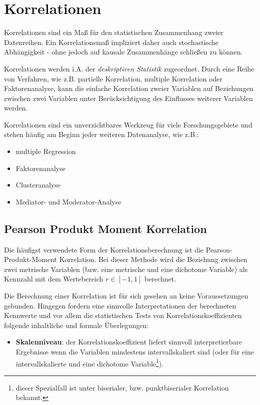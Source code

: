 \documentclass[
]{article}
\providecommand{\tightlist}{%
  \setlength{\itemsep}{0pt}\setlength{\parskip}{0pt}}
\begin{document}
\section*{Korrelationen}\label{korrelationen}

Korrelationen sind ein Maß für den statistischen Zusammenhang zweier Datenreihen. Ein Korrelationsmaß impliziert daher auch stochastische Abhängigkeit - ohne jedoch auf kausale Zusammenhänge schließen zu können.

Korrelationen werden i.A. der \emph{deskriptiven Statistik} zugeordnet. Durch eine Reihe von Verfahren, wie z.B. partielle Korrelation, multiple Korrelation oder Faktorenanalyse, kann die einfache Korrelation zweier Variablen auf Beziehungen zwischen zwei Variablen unter Berücksichtigung des Einflusses weiterer Variablen werden.

Korrelationen sind ein unverzichtbares Werkzeug für viele Forschungsgebiete und stehen häufig am Beginn jeder weiteren Datenanalyse, wie z.B.:

\begin{itemize}
\tightlist
\item
  multiple Regression
\item
  Faktorenanalyse
\item
  Clusteranalyse
\item
  Mediator- und Moderator-Analyse
\end{itemize}

\subsection*{Pearson Produkt Moment Korrelation}\label{pearson-produkt-moment-korrelation}

Die häufigst verwendete Form der Korrelationsberechnung ist die Pearson-Produkt-Moment Korrelation. Bei dieser Methode wird die Beziehung zwischen zwei metrische Variablen (bzw. eine metrische und eine dichotome Variable) als Kennzahl mit dem Wertebereich \(r \in [-1,1]\) berechnet.

Die Berechnung einer Korrelation ist für sich gesehen an keine Voraussetzungen gebunden. Hingegen fordern eine sinnvolle Interpretationen der berechneten Kennwerte und vor allem die statistischen Tests von Korrelationskoeffizienten folgende inhaltliche und formale Überlegungen:

\begin{itemize}
\tightlist
\item
  \textbf{Skalenniveau}: der Korrelationskoeffizient liefert sinnvoll interpretierbare Ergebnisse wenn die Variablen mindestens intervallskaliert sind (oder für eine intervallskalierte und eine dichotome Variable\footnote{dieser Spezialfall ist unter biserialer, bzw. punktbiserialer Korrelation bekannt.}).
\end{itemize}
\end{document}
